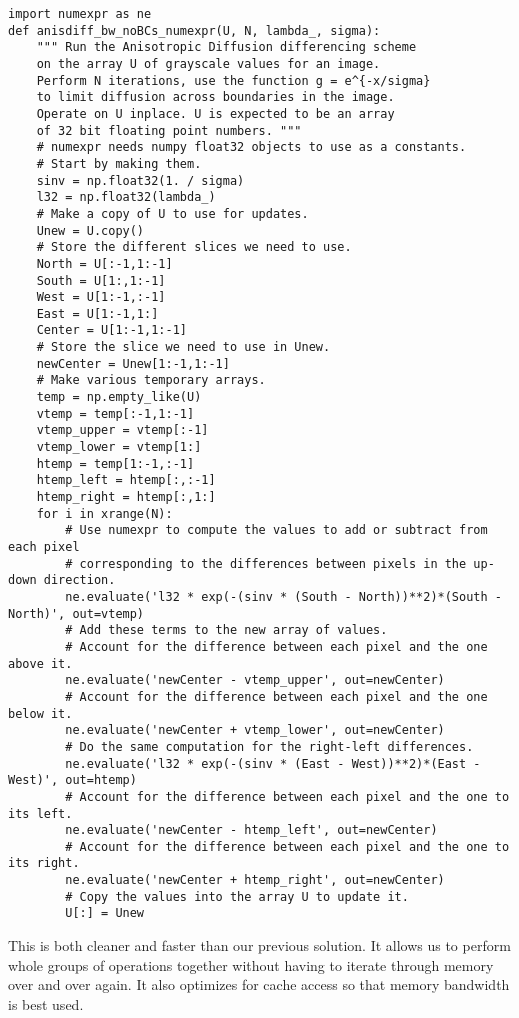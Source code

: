 \begin{lstlisting}
import numexpr as ne
def anisdiff_bw_noBCs_numexpr(U, N, lambda_, sigma):
    """ Run the Anisotropic Diffusion differencing scheme
    on the array U of grayscale values for an image.
    Perform N iterations, use the function g = e^{-x/sigma}
    to limit diffusion across boundaries in the image.
    Operate on U inplace. U is expected to be an array
    of 32 bit floating point numbers. """
    # numexpr needs numpy float32 objects to use as a constants.
    # Start by making them.
    sinv = np.float32(1. / sigma)
    l32 = np.float32(lambda_)
    # Make a copy of U to use for updates.
    Unew = U.copy()
    # Store the different slices we need to use.
    North = U[:-1,1:-1]
    South = U[1:,1:-1]
    West = U[1:-1,:-1]
    East = U[1:-1,1:]
    Center = U[1:-1,1:-1]
    # Store the slice we need to use in Unew.
    newCenter = Unew[1:-1,1:-1]
    # Make various temporary arrays.
    temp = np.empty_like(U)
    vtemp = temp[:-1,1:-1]
    vtemp_upper = vtemp[:-1]
    vtemp_lower = vtemp[1:]
    htemp = temp[1:-1,:-1]
    htemp_left = htemp[:,:-1]
    htemp_right = htemp[:,1:]
    for i in xrange(N):
        # Use numexpr to compute the values to add or subtract from each pixel
        # corresponding to the differences between pixels in the up-down direction.
        ne.evaluate('l32 * exp(-(sinv * (South - North))**2)*(South - North)', out=vtemp)
        # Add these terms to the new array of values.
        # Account for the difference between each pixel and the one above it.
        ne.evaluate('newCenter - vtemp_upper', out=newCenter)
        # Account for the difference between each pixel and the one below it.
        ne.evaluate('newCenter + vtemp_lower', out=newCenter)
        # Do the same computation for the right-left differences.
        ne.evaluate('l32 * exp(-(sinv * (East - West))**2)*(East - West)', out=htemp)
        # Account for the difference between each pixel and the one to its left.
        ne.evaluate('newCenter - htemp_left', out=newCenter)
        # Account for the difference between each pixel and the one to its right.
        ne.evaluate('newCenter + htemp_right', out=newCenter)
        # Copy the values into the array U to update it.
        U[:] = Unew
\end{lstlisting}
This is both cleaner and faster than our previous solution.
It allows us to perform whole groups of operations together without having to iterate through memory over and over again.
It also optimizes for cache access so that memory bandwidth is best used.

